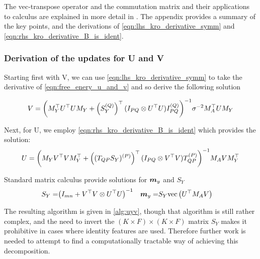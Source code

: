 The vec-transpose operator and the commutation matrix and their applications to calculus are explained in more detail in \cite{Minka2000a}. The appendix provides a summary of the key points, and the derivations of \eqref{eqn:lhs_kro_derivative_symm} and \eqref{eqn:rhs_kro_derivative_B_is_ident}.

\subsubsection*{Derivation of the updates for U and V}

Starting first with V, we can use \eqref{eqn:lhs_kro_derivative_symm} to take the derivative of \eqref{eqn:free_enery_u_and_v} and so derive the following solution

\begin{equation}
V = {\left( M_Y^\top U^\top U M_Y + \left({ S_Y^{(Q)} }\right)^\top (I_{PQ} \otimes U^\top U) { I_{PQ}^{(Q)} }  \right)}^{-1} \sigma^{-2} M_A ^\top U M_Y
\end{equation}

Next, for U, we employ \eqref{eqn:rhs_kro_derivative_B_is_ident} which provides the solution:
\begin{equation}
U = {\left( M_Y V^\top V M_Y^\top + \left( { (T_{QP} S_Y)^{(P)} } \right)^\top (I_{PQ} \otimes V^\top V){ T_{QP}^{(P)} } \right)}^{-1} M_A V M_Y^\top
\end{equation}

Standard matrix calculus provide solutions for $\bm m_y $ and $S_Y$
\begin{align}
S_Y = & {\left( I_{mn} + V^\top V \otimes U^\top U \right)}^{-1}
& \bm m_y = & S_Y \text{vec}\left(U^\top M_A V\right)
\end{align}

The resulting algorithm is given in \ref{alg:uyv}, though that algorithm is still rather complex, and the need to invert the $(K \times F) \times (K \times F)$ matrix $S_Y$ makes it prohibitive in cases where identity features are used. Therefore further work is needed to attempt to find a computationally tractable way of achieving this decomposition.

